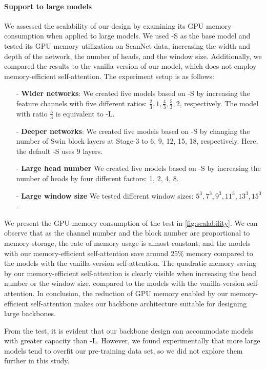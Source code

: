 \documentclass[10pt,twocolumn,letterpaper]{article}
\begin{document}
\paragraph{Support to large models} We assessed the scalability of our design by examining its GPU memory consumption when applied to large models. We used \SST-S as the base model and tested its GPU memory utilization on ScanNet data, increasing the width and depth of the network, the number of heads, and the window size. Additionally, we compared the results to the vanilla version of our model, which does not employ memory-efficient self-attention.  The experiment setup is as follows:
\begin{enumerate}[leftmargin=*]\item[-]\textbf{Wider networks}:  We created five models based on \SST-S by increasing the feature channels with five different ratios: $\frac{2}{3}, 1, \frac{4}{3}, \frac{5}{3}, 2$, respectively. The model with ratio $\frac{5}{3}$ is equivalent to \SST-L.
    \item[-]\textbf{Deeper networks}: We created five models based on \SST-S by changing the number of Swin block layers at Stage-3 to 6, 9, 12, 15, 18, respectively. Here, the default \SST-S uses 9 layers.
    \item[-]\textbf{Large head number} We created five models based on \SST-S by increasing the number of heads by four different factors: 1, 2, 4, 8.
    \item[-]\textbf{Large window size} We tested different window sizes: $5^3, 7^3, 9^3, 11^3, 13^3, 15^3$.
\end{enumerate}
We present the GPU memory consumption of the test in \cref{fig:scalability}. We can observe that as the channel number and the block number are proportional to memory storage, the rate of memory usage is almost constant; and the models with our memory-efficient self-attention save around $25\%$ memory compared to the models with the vanilla-version self-attention. The quadratic memory saving by our memory-efficient self-attention is clearly visible when increasing the head number or the window size, compared to the models with the vanilla-version self-attention. In conclusion, the reduction of GPU memory enabled by our memory-efficient self-attention makes our backbone architecture suitable for designing large backbones.

From the test, it is evident that our backbone design can accommodate models with greater capacity than \SST-L. However, we found experimentally that more large models tend to overfit our pre-training data set, so we did not explore them further in this study.
\end{document}
